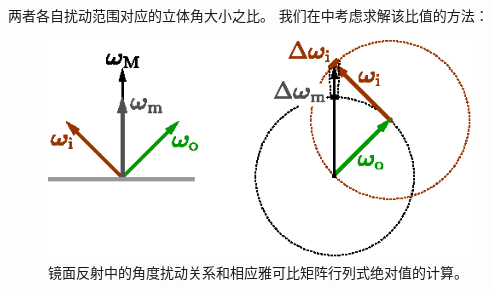 两者各自扰动范围对应的立体角大小之比。
我们在中考虑求解该比值的方法：
\begin{figure}[htbp]
    \centering
    \includegraphics[width=0.6\linewidth]{Pictures/chap08/JacobianRefraction.eps}
    \caption{镜面反射中的角度扰动关系和相应雅可比矩阵行列式绝对值的计算。}
    \label{fig:08ex01-JacobianRefraction}
\end{figure}

